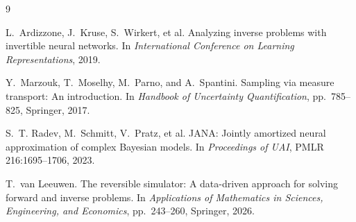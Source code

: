 \documentclass[11pt]{article}
\begin{document}
\vspace{-0.5em}

\begin{thebibliography}{9}

L.~Ardizzone, J.~Kruse, S.~Wirkert, et al.
\newblock Analyzing inverse problems with invertible neural networks.
\newblock In {\em International Conference on Learning Representations}, 2019.

Y.~Marzouk, T.~Moselhy, M.~Parno, and A.~Spantini.
\newblock Sampling via measure transport: An introduction.
\newblock In {\em Handbook of Uncertainty Quantification}, pp.~785--825,
Springer, 2017.

S.~T. Radev, M.~Schmitt, V.~Pratz, et al.
\newblock JANA: Jointly amortized neural approximation of complex Bayesian
models.
\newblock In {\em Proceedings of UAI}, PMLR 216:1695--1706, 2023.

T.~van Leeuwen.
\newblock The reversible simulator: A data-driven approach for solving forward
and inverse problems.
\newblock In {\em Applications of Mathematics in Sciences, Engineering, and
Economics}, pp.~243--260, Springer, 2026.

\end{thebibliography}
\end{document}
